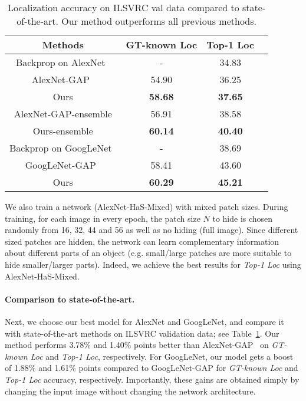 \begin{table}[t!]
\begin{center}
    \footnotesize
    \begin{tabular}{| c | c | c| c|}
    \hline    	
    Methods & GT-known Loc &  Top-1 Loc    \\
    \hline
    Backprop on AlexNet~\cite{simonyan-iclr2014} & - & 34.83 \\
    AlexNet-GAP~\cite{zhou-cvpr2016}  &  54.90 & 36.25\\
    
    Ours         & \textbf{58.68} & \textbf{37.65}  \\
    \hline
    AlexNet-GAP-ensemble   & 56.91 & 38.58 \\
    Ours-ensemble       & \textbf{60.14} & \textbf{40.40}   \\
            \hline
     Backprop on GoogLeNet~\cite{simonyan-iclr2014} & - & 38.69 \\
         GoogLeNet-GAP~\cite{zhou-cvpr2016} & 58.41 & 43.60 \\
         Ours         &  \textbf{60.29} & \textbf{45.21} \\
     \hline
    \end{tabular}
    \caption{Localization accuracy on ILSVRC val data compared to state-of-the-art.  Our method outperforms all previous methods.}
    \label{table:main_results}
\end{center}
\vspace*{-0.15in}
\end{table}



We also train a network (AlexNet-HaS-Mixed) with mixed patch sizes. During training, for each image in every epoch, the patch size $N$ to hide is chosen randomly from 16, 32, 44 and 56 as well as no hiding (full image).  Since different sized patches are hidden, the network can learn complementary information about different parts of an object (e.g. small/large patches are more suitable to hide smaller/larger parts). Indeed, we achieve the best results for \emph{Top-1 Loc} using AlexNet-HaS-Mixed. 

\vspace{-10pt}
\paragraph{Comparison to state-of-the-art.}  Next, we choose our best model for AlexNet and GoogLeNet, and compare it with state-of-the-art methods on ILSVRC validation data; see Table~\ref{table:main_results}. Our method performs 3.78\% and 1.40\% points better than AlexNet-GAP~\cite{zhou-cvpr2016} on \emph{GT-known Loc} and \emph{Top-1 Loc}, respectively. For GoogLeNet, our model gets a boost of 1.88\% and 1.61\% points compared to GoogLeNet-GAP for \emph{GT-known Loc} and \emph{Top-1 Loc} accuracy, respectively.  Importantly, these gains are obtained simply by changing the input image without changing the network architecture.

